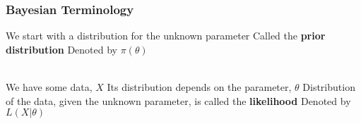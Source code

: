 \documentclass{beamer}
\begin{document}








\begin{frame}
    \frametitle{Bayesian Terminology}\pause

    \begin{outline}
        \1<+-> We start with a distribution for the unknown parameter
            \2<+-> Called the \textbf{prior distribution}
            \2<+-> Denoted by $\pi(\theta)$\\~\

        \1<+-> We have some data, $X$
        \1<+-> Its distribution depends on the parameter, $\theta$
            \2<+-> Distribution of the data, given the unknown parameter, is called the \textbf{likelihood}
            \2<+-> Denoted by $L(X | \theta)$
    \end{outline}
\end{frame}
\end{document}
